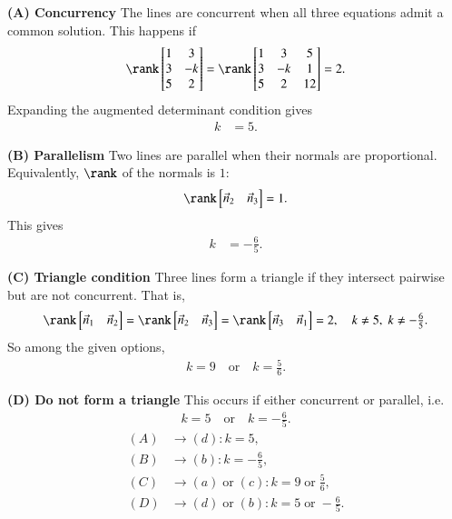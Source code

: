 \documentclass{beamer}
\newcommand{\myvec}[1]{\begin{bmatrix}#1\end{bmatrix}}
\begin{document}
\textbf{(A) Concurrency}
The lines are concurrent when all three equations admit a common solution.  
This happens if
\begin{align}
    \rank\myvec{1 & 3 \\ 3 & -k \\ 5 & 2}
    =
    \rank\myvec{1 & 3 & 5 \\ 3 & -k & 1 \\ 5 & 2 & 12}
    = 2.                                               \label{eq:concurrency}
\end{align}
Expanding the augmented determinant condition gives
\begin{align}
    k &= 5.                                            \label{eq:kconcurrent}
\end{align}

\textbf{(B) Parallelism}
Two lines are parallel when their normals are proportional.  
Equivalently, $\rank$ of the normals is $1$:
\begin{align}
    \rank\myvec{\vec{n}_2 & \vec{n}_3} = 1.            \label{eq:parallelrank}
\end{align}
This gives
\begin{align}
    k &= -\tfrac{6}{5}.                                \label{eq:kparallel}
\end{align}

\textbf{(C) Triangle condition}
Three lines form a triangle if they intersect pairwise but are not concurrent.  
That is,
\begin{align}
    \rank\myvec{\vec{n}_1 & \vec{n}_2} 
    = \rank\myvec{\vec{n}_2 & \vec{n}_3} 
    = \rank\myvec{\vec{n}_3 & \vec{n}_1} = 2, \quad
    k \neq 5,\; k \neq -\tfrac{6}{5}.                  \label{eq:trianglecond}
\end{align}
So among the given options,
\begin{align}
    k = 9 \quad \text{or} \quad k = \tfrac{5}{6}.      \label{eq:ktriangle}
\end{align}

\textbf{(D) Do not form a triangle}
This occurs if either concurrent or parallel, i.e.
\begin{align}
    k = 5 \quad \text{or} \quad k = -\tfrac{6}{5}.     \label{eq:notriangle}
\end{align}
\begin{align}
    (A)&\to (d): k=5, \\
    (B)&\to (b): k=-\tfrac{6}{5}, \\
    (C)&\to (a)\;\text{or}\;(c): k=9 \;\text{or}\;\tfrac{5}{6}, \\
    (D)&\to (d)\;\text{or}\;(b): k=5 \;\text{or}\; -\tfrac{6}{5}.
\end{align}
\end{document}
